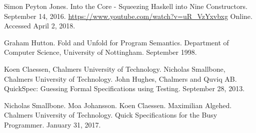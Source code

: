 \documentclass[11pt]{article}
\begin{document}
\begin{thebibliography}{8}
        Simon Peyton Jones. Into the Core - Squeezing Haskell into
        Nine Constructors. September 14, 2016.
        \url{https://www.youtube.com/watch?v=uR_VzYxvbxg}
        Online. Accessed April 2, 2018.

        Graham Hutton. Fold and Unfold for Program Semantics. Department of
        Computer Science, University of Nottingham. September 1998.

        Koen Claessen, Chalmers University of Technology. Nicholas Smallbone,
        Chalmers University of Technology. John Hughes, Chalmers and Quviq AB.
        QuickSpec: Guessing Formal Specifications using Testing.
        September 28, 2013.

        Nicholas Smallbone. Moa Johansson. Koen Claessen. Maximilian Algehed.
        Chalmers University of Technology.
        Quick Specifications for the Busy Programmer. January 31, 2017.

    \end{thebibliography}   

    \newpage

    \appendix
\end{document}
